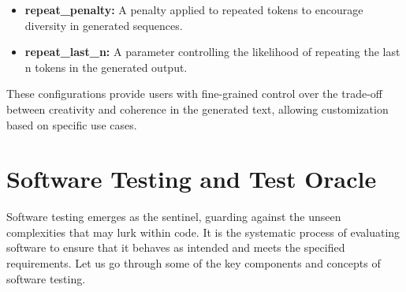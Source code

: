 \begin{enumerate}
\begin{itemize}
            \item \textbf{repeat\_penalty:} A penalty applied to repeated tokens to encourage diversity in generated sequences.
    
            \item \textbf{repeat\_last\_n:} A parameter controlling the likelihood of repeating the last n tokens in the generated output.
        \end{itemize}

    These configurations provide users with fine-grained control over the trade-off between creativity and coherence in the generated text, allowing customization based on specific use cases.
    
\end{enumerate}

\section{Software Testing and Test Oracle}
\label{sec:software_testing_and_oracle}
\vspace{0.2 cm}

Software testing emerges as the sentinel, guarding against the unseen complexities that may lurk within code. It is the systematic process of evaluating software to ensure that it behaves as intended and meets the specified requirements. Let us go through some of the key components and concepts of software testing.

